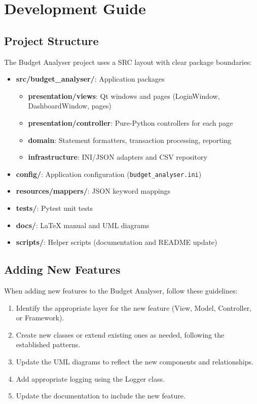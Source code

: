\documentclass[11pt,a4paper]{report}
\begin{document}
\chapter{Development Guide}

\section{Project Structure}
The Budget Analyser project uses a SRC layout with clear package boundaries:

\begin{itemize}
    \item \textbf{src/budget\_analyser/}: Application packages
        \begin{itemize}
            \item \textbf{presentation/views}: Qt windows and pages (LoginWindow, DashboardWindow, pages)
            \item \textbf{presentation/controller}: Pure-Python controllers for each page
            \item \textbf{domain}: Statement formatters, transaction processing, reporting
            \item \textbf{infrastructure}: INI/JSON adapters and CSV repository
        \end{itemize}
    \item \textbf{config/}: Application configuration (\texttt{budget\_analyser.ini})
    \item \textbf{resources/mappers/}: JSON keyword mappings
    \item \textbf{tests/}: Pytest unit tests
    \item \textbf{docs/}: LaTeX manual and UML diagrams
    \item \textbf{scripts/}: Helper scripts (documentation and README update)
\end{itemize}

\section{Adding New Features}
When adding new features to the Budget Analyser, follow these guidelines:

\begin{enumerate}
    \item Identify the appropriate layer for the new feature (View, Model, Controller, or Framework).
    \item Create new classes or extend existing ones as needed, following the established patterns.
    \item Update the UML diagrams to reflect the new components and relationships.
    \item Add appropriate logging using the Logger class.
    \item Update the documentation to include the new feature.
\end{enumerate}
\end{document}
